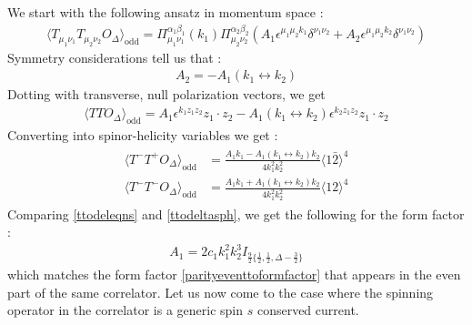 \documentclass[a4paper,11pt]{article}
\begin{document}
We start with the following ansatz in momentum space :
\begin{align}
 \langle T_{\mu_1 \nu_1}T_{\mu_2 \nu_2}O_{\Delta} \rangle_{\text{odd}} = \Pi_{\mu_1 \nu_1}^{\alpha_1 \beta_1}(k_1) \Pi_{\mu_2 \nu_2}^{\alpha_2 \beta_2}\left(A_1\epsilon^{\mu_1\mu_2 k_1}\delta^{\nu_1 \nu_2}+A_2 \epsilon^{\mu_1 \mu_2 k_2}\delta^{\nu_1 \nu_2}\right)
\end{align}
Symmetry considerations tell us that :
\begin{align}
    A_2= -A_1(k_1 \leftrightarrow k_2)
\end{align}
Dotting with transverse, null polarization vectors, we get
\begin{align}
 \langle TTO_{\Delta} \rangle_{\text{odd}} = A_1 \epsilon^{k_1 z_1 z_2} z_1 \cdot z_2-A_1(k_1 \leftrightarrow k_2)\epsilon^{k_2 z_1 z_2}z_1 \cdot z_2
\end{align}
Converting into spinor-helicity variables we get :
\begin{align}\label{ttodeleqns}
\begin{split}
\langle T^- T^+ O_{\Delta} \rangle _{\text{odd}}&=\frac{A_1 k_1 -A_1(k_1 \leftrightarrow k_2) k_2 }{4 k_1^2 k_2^2}\langle 1 \bar{2} \rangle^4\\[5 pt]
\langle T^- T^- O_{\Delta} \rangle_{\text{odd}} &= \frac{A_1 k_1 + A_1(k_1 \leftrightarrow k_2) k_2 }{4 k_1^2 k_2^2}\langle 1 2 \rangle^4
\end{split}
\end{align}
Comparing \eqref{ttodeleqns} and \eqref{ttodeltasph}, we get the following for the form factor :
\begin{align}
 A_1 = 2c_1 k_1^2 k_2^3I_{\frac{9}{2}\{\frac{1}{2},\frac{1}{2},\Delta-\frac{3}{2}\}}
\end{align}
which matches the form factor \eqref{parityeventtoformfactor} that appears in the even part of the same correlator.
Let us now come to the case where the spinning operator in the correlator is a generic spin $s$ conserved current.
\end{document}
